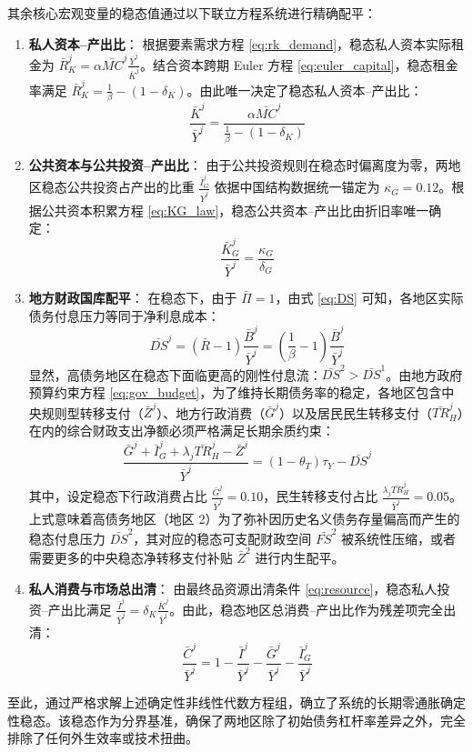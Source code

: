 \documentclass[12pt,UTF8]{ctexart}
\begin{document}
	其余核心宏观变量的稳态值通过以下联立方程系统进行精确配平：
	\begin{enumerate}
		\item \textbf{私人资本--产出比}：
		根据要素需求方程 \eqref{eq:rk_demand}，稳态私人资本实际租金为 $\bar{R}_K^j = \alpha \bar{MC}^j \frac{\bar{Y}^j}{\bar{K}^j}$。结合资本跨期 Euler 方程 \eqref{eq:euler_capital}，稳态租金率满足 $\bar{R}_K^j = \frac{1}{\beta} - (1-\delta_K)$。由此唯一决定了稳态私人资本--产出比：
		\begin{equation}
			\frac{\bar{K}^j}{\bar{Y}^j} = \frac{\alpha \bar{MC}^j}{\frac{1}{\beta} - (1-\delta_K)}
		\end{equation}
		
		\item \textbf{公共资本与公共投资--产出比}：
		由于公共投资规则在稳态时偏离度为零，两地区稳态公共投资占产出的比重 $\frac{\bar{I}_G^j}{\bar{Y}^j}$ 依据中国结构数据统一锚定为 $\kappa_G = 0.12$。根据公共资本积累方程 \eqref{eq:KG_law}，稳态公共资本--产出比由折旧率唯一确定：
		\begin{equation}
			\frac{\bar{K}_G^j}{\bar{Y}^j} = \frac{\kappa_G}{\delta_G}
		\end{equation}
		
		\item \textbf{地方财政国库配平}：
		在稳态下，由于 $\bar{\Pi} = 1$，由式 \eqref{eq:DS} 可知，各地区实际债务付息压力等同于净利息成本：
		\begin{equation}
			\bar{DS}^j = (\bar{R} - 1)\frac{\bar{B}^j}{\bar{Y}^j} = \left(\frac{1}{\beta}-1\right)\frac{\bar{B}^j}{\bar{Y}^j}
		\end{equation}
		显然，高债务地区在稳态下面临更高的刚性付息流：$\bar{DS}^2 > \bar{DS}^1$。由地方政府预算约束方程 \eqref{eq:gov_budget}，为了维持长期债务率的稳定，各地区包含中央规则型转移支付（$\bar{Z}^j$）、地方行政消费（$\bar{G}^j$）以及居民民生转移支付（$\bar{TR}_H^j$）在内的综合财政支出净额必须严格满足长期余质约束：
		\begin{equation}
			\frac{\bar{G}^j + \bar{I}_G^j + \lambda_j \bar{TR}_H^j - \bar{Z}^j}{\bar{Y}^j} = (1-\theta_T)\tau_Y - \bar{DS}^j
		\end{equation}
		其中，设定稳态下行政消费占比 $\frac{\bar{G}^j}{\bar{Y}^j} = 0.10$，民生转移支付占比 $\frac{\lambda_j\bar{TR}_H^j}{\bar{Y}^j} = 0.05$。上式意味着高债务地区（地区 2）为了弥补因历史名义债务存量偏高而产生的稳态付息压力 $\bar{DS}^2$，其对应的稳态可支配财政空间 $\bar{FS}^2$ 被系统性压缩，或者需要更多的中央稳态净转移支付补贴 $\bar{Z}^2$ 进行内生配平。
		
		\item \textbf{私人消费与市场总出清}：
		由最终品资源出清条件 \eqref{eq:resource}，稳态私人投资--产出比满足 $\frac{\bar{I}^j}{\bar{Y}^j} = \delta_K \frac{\bar{K}^j}{\bar{Y}^j}$。由此，稳态地区总消费--产出比作为残差项完全出清：
		\begin{equation}
			\frac{\bar{C}^j}{\bar{Y}^j} = 1 - \frac{\bar{I}^j}{\bar{Y}^j} - \frac{\bar{G}^j}{\bar{Y}^j} - \frac{\bar{I}_G^j}{\bar{Y}^j}
		\end{equation}
	\end{enumerate}
	至此，通过严格求解上述确定性非线性代数方程组，确立了系统的长期零通胀确定性稳态。该稳态作为分界基准，确保了两地区除了初始债务杠杆率差异之外，完全排除了任何外生效率或技术扭曲。
	
\end{document}
